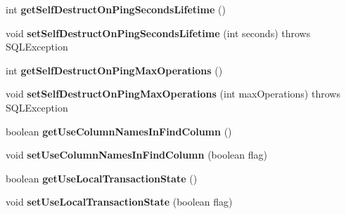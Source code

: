 \begin{DoxyCompactItemize}
int {\bfseries get\+Self\+Destruct\+On\+Ping\+Seconds\+Lifetime} ()
\item 
\mbox{\label{classcom_1_1mysql_1_1jdbc_1_1_connection_properties_impl_acd2c58417243cbb6a7658e7b45d918a5}} 
void {\bfseries set\+Self\+Destruct\+On\+Ping\+Seconds\+Lifetime} (int seconds)  throws S\+Q\+L\+Exception 
\item 
\mbox{\label{classcom_1_1mysql_1_1jdbc_1_1_connection_properties_impl_abae298c2fdb0766e5293ed4bc966b018}} 
int {\bfseries get\+Self\+Destruct\+On\+Ping\+Max\+Operations} ()
\item 
\mbox{\label{classcom_1_1mysql_1_1jdbc_1_1_connection_properties_impl_a595543ad1f9a66313a9428115d07309e}} 
void {\bfseries set\+Self\+Destruct\+On\+Ping\+Max\+Operations} (int max\+Operations)  throws S\+Q\+L\+Exception 
\item 
\mbox{\label{classcom_1_1mysql_1_1jdbc_1_1_connection_properties_impl_ab4450d4948f24fc8a5b2a0aa9df1e7c0}} 
boolean {\bfseries get\+Use\+Column\+Names\+In\+Find\+Column} ()
\item 
\mbox{\label{classcom_1_1mysql_1_1jdbc_1_1_connection_properties_impl_a13d9fe5f78c55083e1f55556768cfc65}} 
void {\bfseries set\+Use\+Column\+Names\+In\+Find\+Column} (boolean flag)
\item 
\mbox{\label{classcom_1_1mysql_1_1jdbc_1_1_connection_properties_impl_aa330bae2fbbb0eb4940bb176cdc9d1b9}} 
boolean {\bfseries get\+Use\+Local\+Transaction\+State} ()
\item 
\mbox{\label{classcom_1_1mysql_1_1jdbc_1_1_connection_properties_impl_a79cf6e959fe148fcea157a578d154163}} 
void {\bfseries set\+Use\+Local\+Transaction\+State} (boolean flag)
\item 
\mbox{\label{classcom_1_1mysql_1_1jdbc_1_1_connection_properties_impl_a345390097b41411481a59b1c941ee4f6}} 

\end{DoxyCompactItemize}
